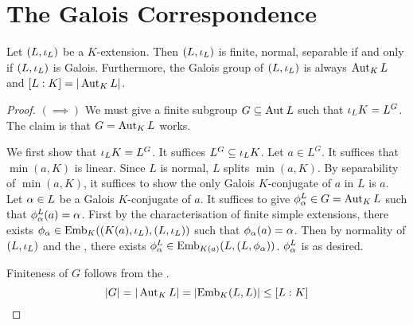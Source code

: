 \documentclass[main.tex]{subfiles}
\begin{document}
\section{The Galois Correspondence}

\begin{thm} 
  
  Let $(L,\iota_L)$ be a $K$-extension.
  Then $(L,\iota_L)$ is finite, normal, separable if and only if 
  $(L,\iota_L)$ is Galois. 
  Furthermore, the Galois group of $(L,\iota_L)$ is always $\operatorname{Aut}_{K}{L}$
  and $[L : K] = |\operatorname{Aut}_{K}{L}|$. 

\end{thm}
\begin{proof}
  $(\implies)$ We must give a finite subgroup $G \subseteq \operatorname{Aut}_{}{L}$
  such that $\iota_L K = L^G$. 
  The claim is that $G = \operatorname{Aut}_{K}{L}$ works. 

  We first show that $\iota_L K = L^G$. 
  It suffices $L^G \subseteq \iota_L K$. 
  Let $a \in L^G$. It suffices that $\min(a,K)$ is linear. 
  Since $L$ is normal, $L$ splits $\min(a,K)$. 
  By separability of $\min(a,K)$,
  it suffices to show the only Galois $K$-conjugate of $a$ in $L$ is $a$.
  Let $\alpha \in L$ be a Galois $K$-conjugate of $a$. 
  It suffices to give $\phi_\alpha^L \in G = \operatorname{Aut}_{K}{L}$ such that 
  $\phi_\alpha^L(a) = \alpha$.
  First by the 
  {characterisation of finite simple extensions}, 
  there exists $\phi_\alpha \in \mathrm{Emb}_{K}((K(a),\iota_L), (L,\iota_L))$
  such that $\phi_\alpha(a) = \alpha$. 
  Then by normality of $(L,\iota_L)$ and 
  the ,
  there exists $\phi_\alpha^L \in \mathrm{Emb}_{K(a)}(L, (L,\phi_\alpha))$.
  $\phi_\alpha^L$ is as desired.


  Finiteness of $G$ follows from 
  the .
  \[ |G| = |\operatorname{Aut}_{K}{L}| = |\mathrm{Emb}_{K}(L, L)| \leq [L : K] \]


\end{proof}
\end{document}

